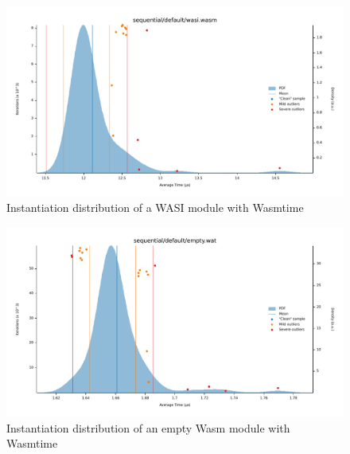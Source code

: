 \begin{figure}[htbp]
    \centering
        \includegraphics[width=1\linewidth]{images/benches/sequential_default_wasi.pdf}
    \caption{Instantiation distribution of a WASI module with Wasmtime}
    \label{fig:bench:instantiation:wasi}
\end{figure}

\begin{figure}[htbp]
    \centering
        \includegraphics[width=1\linewidth]{images/benches/sequential_default_empty_wasm.pdf}
    \caption{Instantiation distribution of an empty Wasm module with Wasmtime}
    \label{fig:bench:instantiation:empty-wasm}
\end{figure}
